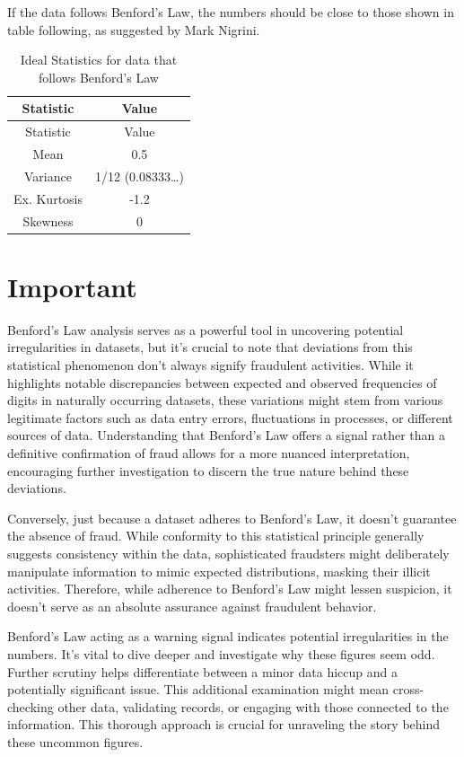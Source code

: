 \documentclass[
]{book}
\begin{document}
If the data follows Benford's Law, the numbers should be close to those shown in table following, as suggested by Mark Nigrini.

\begin{longtable}[]{@{}cc@{}}
\caption{\label{tab:benford} Ideal Statistics for data that follows Benford's Law}\tabularnewline
\toprule\noalign{}
Statistic & Value \\
\midrule\noalign{}
\endfirsthead
\toprule\noalign{}
Statistic & Value \\
\midrule\noalign{}
\endhead
\bottomrule\noalign{}
\endlastfoot
Mean & 0.5 \\
Variance & 1/12 (0.08333\ldots) \\
Ex. Kurtosis & -1.2 \\
Skewness & 0 \\
\end{longtable}

\hypertarget{important}{%
\section{Important}\label{important}}

Benford's Law analysis serves as a powerful tool in uncovering potential irregularities in datasets, but it's crucial to note that deviations from this statistical phenomenon don't always signify fraudulent activities. While it highlights notable discrepancies between expected and observed frequencies of digits in naturally occurring datasets, these variations might stem from various legitimate factors such as data entry errors, fluctuations in processes, or different sources of data. Understanding that Benford's Law offers a signal rather than a definitive confirmation of fraud allows for a more nuanced interpretation, encouraging further investigation to discern the true nature behind these deviations.

Conversely, just because a dataset adheres to Benford's Law, it doesn't guarantee the absence of fraud. While conformity to this statistical principle generally suggests consistency within the data, sophisticated fraudsters might deliberately manipulate information to mimic expected distributions, masking their illicit activities. Therefore, while adherence to Benford's Law might lessen suspicion, it doesn't serve as an absolute assurance against fraudulent behavior.

Benford's Law acting as a warning signal indicates potential irregularities in the numbers. It's vital to dive deeper and investigate why these figures seem odd. Further scrutiny helps differentiate between a minor data hiccup and a potentially significant issue. This additional examination might mean cross-checking other data, validating records, or engaging with those connected to the information. This thorough approach is crucial for unraveling the story behind these uncommon figures.
\end{document}
